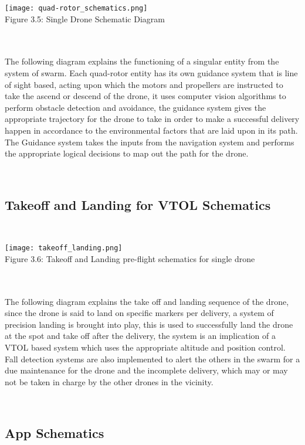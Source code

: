 \documentclass[conference]{IEEEtran}
\begin{document}
\graphicspath{ {./images/} }
\texttt{[image: quad-rotor\_schematics.png]}\\
\caption{Figure 3.5: Single Drone Schematic Diagram}\\\\
\caption{ The following diagram explains the functioning of a singular entity from the system of swarm. Each quad-rotor entity has its own guidance system that is line of sight based, acting upon which the motors and propellers are instructed to take the ascend or descend of the drone, it uses computer vision algorithms to perform obstacle detection and avoidance, the guidance system gives the appropriate trajectory for the drone to take in order to make a successful delivery happen in accordance to the environmental factors that are laid upon in its path. The Guidance system takes the inputs from the navigation system and performs the appropriate logical decisions to map out the path for the drone.
}\\

\subsection{Takeoff and Landing for VTOL Schematics}\\

\graphicspath{ {./images/} }
\texttt{[image: takeoff\_landing.png]}\\
\caption{Figure 3.6: Takeoff and Landing pre-flight schematics for single drone}\\\\
\caption{ The following diagram explains the take off and landing sequence of the drone, since the drone is said to land on specific markers per delivery, a system of precision landing is brought into play, this is used to successfully land the drone at the spot and take off after the delivery, the system is an implication of a VTOL based system which uses the appropriate altitude and position control. Fall detection systems are also implemented to alert the others in the swarm for a due maintenance for the drone and the incomplete delivery, which may or may not be taken in charge by the other drones in the vicinity.  
}\\

\subsection{App Schematics}\\
\end{document}
